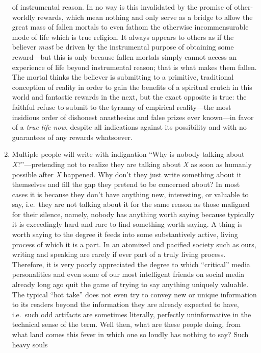 \documentclass[a4paper,12pt,margin=.5in]{article}
\begin{document}
\begin{enumerate}
  of instrumental reason. In no way is this invalidated by the promise
  of other-worldly rewards, which mean nothing and only serve as a
  bridge to allow the great mass of fallen mortals to even fathom the
  otherwise incommensurable mode of life which is true religion. It
  always appears to others as if the believer \emph{must} be driven by
  the instrumental purpose of obtaining some reward---but this is only
  because fallen mortals simply cannot access an experience of life
  beyond instrumental reason; that is what makes them fallen. The mortal
  thinks the believer is submitting to a primitive, traditional
  conception of reality in order to gain the benefits of a spiritual
  crutch in this world and fantastic rewards in the next, but the exact
  opposite is true: the faithful refuse to submit to the tyranny of
  empirical reality---the most insidious order of dishonest anasthesias
  and false prizes ever known---in favor of a \emph{true life now},
  despite all indications against its possibility and with no guarantees
  of any rewards whatsoever.
\item
  Multiple people will write with indignation ``Why is nobody talking
  about \emph{X}?''---pretending not to realize they are talking about
  \emph{X} as soon as humanly possible after \emph{X} happened. Why
  don't they just write something about it themselves and fill the gap
  they pretend to be concerned about? In most cases it is because they
  don't have anything new, interesting, or valuable to say, i.e.~they
  are not talking about it for the same reason as those maligned for
  their silence, namely, nobody has anything worth saying because
  typically it is exceedingly hard and rare to find something worth
  saying. A thing is worth saying to the degree it feeds into some
  substantively active, living process of which it is a part. In an
  atomized and pacified society such as ours, writing and speaking are
  rarely if ever part of a truly living process. Therefore, it is very
  poorly appreciated the degree to which ``critical'' media
  personalities and even some of our most intelligent friends on social
  media already long ago quit the game of trying to say anything
  uniquely valuable. The typical ``hot take'' does not even try to
  convey new or unique information to its readers beyond the information
  they are already expected to have, i.e.~such odd artifacts are
  sometimes literally, perfectly uninformative in the technical sense of
  the term. Well then, what are these people doing, from what land comes
  this fever in which one so loudly has nothing to say? Such heavy souls

\end{enumerate}
\end{document}
